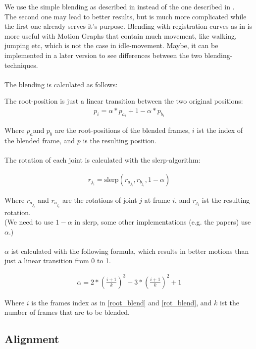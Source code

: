 \documentclass[a4paper,10pt,titlepage,bibliography=totocnumbered]{scrartcl}
\newcommand{\slerp}{\mathrm{slerp}}
\begin{document}
We use the simple blending as described in \cite[3.3 Creating Transitions]{kovar2012} instead of the one described in \cite{kovar2003}.
\\
The second one may lead to better results, but is much more complicated while the first one already serves it's purpose. Blending with registration curves as in \cite{kovar2003} is more useful with Motion Graphs that contain much movement, like walking, jumping etc, which is not the case in idle-movement. Maybe, it can be implemented in a later version to see differences between the two blending-techniques.
\\\\
The blending is calculated as follows:

The root-position is just a linear transition between the two original positions:
\begin{align}
\label{root_blend}
p_i=\alpha * p_{a_i} + 1-\alpha * p_{b_i}
\end{align}

Where \(p_a \)and \(p_b\) are the root-positions of the blended frames, \(i\) ist the index of the blended frame, and \(p\) is the resulting position.
\\\\
The rotation of each joint is calculated with the slerp-algorithm:

\begin{align}
\label{rot_blend}
r_{j_i} = \slerp(r_{a_{j_i}},r_{b_{j_i}}, 1-\alpha)
\end{align}

Where \(r_{a_{j_i}}\) and \(r_{a_{j_i}}\) are the rotations of joint \(j\) at frame \(i\), and \(r_{j_i}\) ist the resulting rotation.
\\
(We need to use \(1-\alpha\) in \(\slerp\), some other implementations (e.g. the papers) use \(\alpha\).)
\\\\
\(\alpha\) ist calculated with the following formula, which results in better motions than just a linear transition from 0 to 1.

\begin{align}
\alpha = 2 * \left( \frac{i+1}{k} \right)^3 - 3 * \left( \frac{i+1}{k} \right)^2 + 1
\end{align}

Where \(i\) is the frames index as in \eqref{root_blend} and \eqref{rot_blend}, and \(k\) ist the number of frames that are to be blended.


\subsection{Alignment}
\label{sec:alignment}
\end{document}
